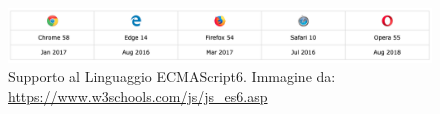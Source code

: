 \begin{figure}[H]
	\begin{center}
		\includegraphics[scale=0.4]{./images/ES6_Support.png}
		 \caption{Supporto al Linguaggio ECMAScript6. Immagine da: \url{https://www.w3schools.com/js/js_es6.asp}}
		 \label{SupportoECMAScript}	
	\end{center}
\end{figure}

\pagebreak


